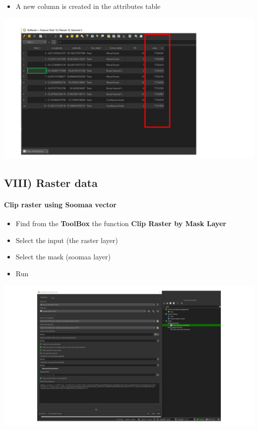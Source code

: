 \documentclass[
  letterpaper,
  DIV=11,
  numbers=noendperiod]{scrartcl}
\let\oldparagraph\paragraph
\renewcommand{\paragraph}[1]{\oldparagraph{#1}\mbox{}}
\providecommand{\tightlist}{%
  \setlength{\itemsep}{0pt}\setlength{\parskip}{0pt}}\usepackage{longtable,booktabs,array}
\begin{document}
\begin{itemize}
\tightlist
\item
  A new column is created in the attributes table
\end{itemize}

\includegraphics{Lab1/qgis_ss/QGIS_ss24.png}

\hypertarget{viii-raster-data}{%
\subsection{VIII) Raster data}\label{viii-raster-data}}

\hypertarget{clip-raster-using-soomaa-vector}{%
\paragraph{Clip raster using Soomaa
vector}\label{clip-raster-using-soomaa-vector}}

\begin{itemize}
\tightlist
\item
  Find from the \textbf{ToolBox} the function \textbf{Clip Raster by
  Mask Layer}
\item
  Select the input (the raster layer)
\item
  Select the mask (soomaa layer)
\item
  Run
\end{itemize}

\includegraphics{Lab1/qgis_ss/QGIS_ss25.png}
\end{document}
